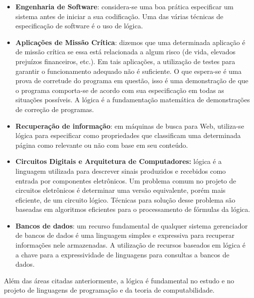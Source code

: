 \begin{itemize}
  \item \textbf{Engenharia de Software}: considera-se uma boa pr\'atica especificar um sistema antes 
        de iniciar a sua codifica\c{c}\~ao. Uma das v\'arias t\'ecnicas de especifica\c{c}\~ao de 
        software \'e o uso de l\'ogica.
  \item \textbf{Aplica\c{c}\~oes de Miss\~ao Cr\'itica}: dizemos que uma determinada aplica\c{c}\~ao 
        \'e de miss\~ao cr\'itica se essa est\'a relacionada a algum risco (de vida, elevados preju\'izos financeiros, etc.).
        Em tais aplica\c{c}\~oes, a utiliza\c{c}\~ao de testes para garantir o funcionamento adequado 
        n\~ao \'e suficiente. O que espera-se \'e uma prova de corretude do programa em quest\~ao, isso \'e uma
        demonstra\c{c}\~ao de que o programa comporta-se de acordo com sua especifica\c{c}\~ao em todas as
        situa\c{c}\~oes poss\'iveis. A l\'ogica \'e a fundamenta\c{c}\~ao matem\'atica de demonstra\c{c}\~oes de
        corre\c{c}\~ao de programas.
   \item \textbf{Recupera\c{c}\~ao de informa\c{c}\~ao}: em m\'aquinas de busca para Web, utiliza-se l\'ogica para
         especificar como propriedades que classificam uma determinada p\'agina como relevante ou n\~ao com base
         em seu conte\'udo.
   \item \textbf{Circuitos Digitais e Arquitetura de Computadores:} l\'ogica \'e a linguagem utilizada para descrever
         sinais produzidos e recebidos como entrada por componentes eletr\^onicos. Um problema comum no projeto de
         circuitos eletr\^onicos \'e determinar uma vers\~ao equivalente, por\'em mais eficiente, de um circuito l\'ogico.
         T\'ecnicas para solu\c{c}\~ao desse problema s\~ao baseadas em algoritmos eficientes para o processamento de
         f\'ormulas da l\'ogica.
   \item \textbf{Bancos de dados}: um recurso fundamental de qualquer sistema gerenciador de bancos de dados \'e uma linguagem
         simples e expressiva para recuperar informa\c{c}\~oes nele armazenadas. A utiliza\c{c}\~ao de recursos baseados em 
         l\'ogica \'e a chave para a expressividade de linguagens para consultas a bancos de dados.       
\end{itemize}

Al\'em das \'areas citadas anteriormente, a l\'ogica \'e fundamental no estudo e no projeto de linguagens de programa\c{c}\~ao
e da teoria de computabilidade.

